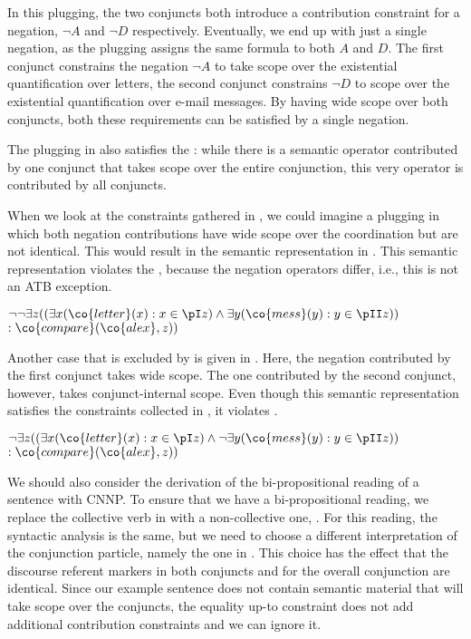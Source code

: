 \documentclass[output=paper]{langsci/langscibook}
\begin{document}
In this plugging, the two conjuncts both introduce a contribution constraint for a negation, $\lnot A$ and $\lnot D$ respectively. 
Eventually, we end up with just a single negation, as the plugging assigns the same formula to both $A$ and $D$. 
The first conjunct constrains the negation $\lnot A$ to take scope over the existential quantification over letters, the second conjunct constrains $\lnot D$ to scope over the existential quantification over e-mail messages. 
By having wide scope over both conjuncts, both these requirements can be satisfied by a single negation.

The plugging in  also satisfies the \SemATB: 
while there is a semantic operator contributed by one conjunct that takes scope over the entire conjunction, this very operator is contributed by all conjuncts.

When we look at the constraints gathered in , we could imagine a plugging in which both negation contributions have wide scope over the coordination but are not identical. This would result in the semantic representation in . 
This semantic representation violates the \SemATB, because the negation operators differ, i.e., this is not an ATB exception.

\ea \label{ex-brief-mail-plugDN}
$\lnot\lnot \exists z ((\exists x (\co{letter}(x):x \in \pI z) \land \exists y (\co{mess}(y) : y \in \pII z))$\\
\hspace*{\fill}$: \co{compare}(\co{alex},z))$
\z 

Another case that is excluded by \SemATB{} is given in . Here, the negation contributed by the first conjunct takes wide scope. The one contributed by the second conjunct, however, takes conjunct-internal scope. Even though this semantic representation satisfies the constraints collected in , it violates \SemATB.

\ea \label{ex-brief-mail-plug3}
$\lnot \exists z ((\exists x (\co{letter}(x):x \in \pI z) \land 
\lnot \exists y (\co{mess}(y) : y \in \pII z))$\\
\hspace*{\fill}$: \co{compare}(\co{alex},z))$
\z 

We should also consider the derivation of the bi-propositional reading of a sentence with CNNP.
To ensure that we have a bi-propositional reading, we replace the collective verb in  with a non-collective one, .
For this reading, the syntactic analysis is the same, but we need to choose a different interpretation of the conjunction particle, namely the one in 
.
This choice has the effect that the discourse referent markers in both conjuncts and for the overall conjunction are identical. 
Since our example sentence does not contain semantic material that will take scope over the conjuncts, the equality up-to constraint does not add additional contribution constraints and we can ignore it.
\end{document}
